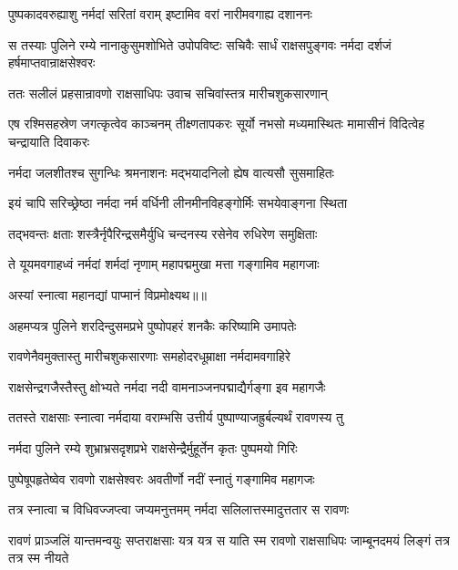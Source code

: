 \twolineshloka
{पुष्पकादवरुह्याशु नर्मदां सरितां वराम्}
{इष्टामिव वरां नारीमवगाह्य दशाननः} %

\threelineshloka
{स तस्याः पुलिने रम्ये नानाकुसुमशोभिते}
{उपोपविष्टः सचिवैः सार्धं राक्षसपुङ्गवः}
{नर्मदा दर्शजं हर्षमाप्तवान्राक्षसेश्वरः} %

\twolineshloka
{ततः सलीलं प्रहसान्रावणो राक्षसाधिपः}
{उवाच सचिवांस्तत्र मारीचशुकसारणान्} %

\threelineshloka
{एष रश्मिसहस्रेण जगत्कृत्वेव काञ्चनम्}
{तीक्ष्णतापकरः सूर्यो नभसो मध्यमास्थितः}
{मामासीनं विदित्वेह चन्द्रायाति दिवाकरः} %

\twolineshloka
{नर्मदा जलशीतश्च सुगन्धिः श्रमनाशनः}
{मद्भयादनिलो ह्येष वात्यसौ सुसमाहितः} %

\twolineshloka
{इयं चापि सरिच्छ्रेष्ठा नर्मदा नर्म वर्धिनी}
{लीनमीनविहङ्गोर्मिः सभयेवाङ्गना स्थिता} %

\twolineshloka
{तद्भवन्तः क्षताः शस्त्रैर्नृपैरिन्द्रसमैर्युधि}
{चन्दनस्य रसेनेव रुधिरेण समुक्षिताः} %

\twolineshloka
{ते यूयमवगाहध्वं नर्मदां शर्मदां नृणाम्}
{महापद्ममुखा मत्ता गङ्गामिव महागजाः} %

{अस्यां स्नात्वा महानद्यां पाप्मानं विप्रमोक्ष्यथ॥॥} %

\addtocounter{shlokacount}{1}

\twolineshloka
{अहमप्यत्र पुलिने शरदिन्दुसमप्रभे}
{पुष्पोपहरं शनकैः करिष्यामि उमापतेः} %

\twolineshloka
{रावणेनैवमुक्तास्तु मारीचशुकसारणाः}
{समहोदरधूम्राक्षा नर्मदामवगाहिरे} %

\twolineshloka
{राक्षसेन्द्रगजैस्तैस्तु क्षोभ्यते नर्मदा नदी}
{वामनाञ्जनपद्माद्यैर्गङ्गा इव महागजैः} %

\twolineshloka
{ततस्ते राक्षसाः स्नात्वा नर्मदाया वराम्भसि}
{उत्तीर्य पुष्पाण्याजह्रुर्बल्यर्थं रावणस्य तु} %

\twolineshloka
{नर्मदा पुलिने रम्ये शुभ्राभ्रसदृशप्रभे}
{राक्षसेन्द्रैर्मुहूर्तेन कृतः पुष्पमयो गिरिः} %

\twolineshloka
{पुष्पेषूपहृतेष्वेव रावणो राक्षसेश्वरः}
{अवतीर्णो नदीं स्नातुं गङ्गामिव महागजः} %

\twolineshloka
{तत्र स्नात्वा च विधिवज्जप्त्वा जप्यमनुत्तमम्}
{नर्मदा सलिलात्तस्मादुत्ततार स रावणः} %

\threelineshloka
{रावणं प्राञ्जलिं यान्तमन्वयुः सप्तराक्षसाः}
{यत्र यत्र स याति स्म रावणो राक्षसाधिपः}
{जाम्बूनदमयं लिङ्गं तत्र तत्र स्म नीयते} %

